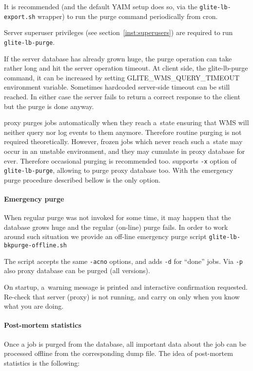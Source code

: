 It is recommended (and the default YAIM setup does so, via
the \verb'glite-lb-export.sh' wrapper) to run the purge
command periodically from cron.

Server superuser privileges (see section~\ref{inst:superusers}) are required to run \verb'glite-lb-purge'.

If the server database has already grown huge, the purge operation can take
rather long and hit the \LB server operation timeout. At client side, \ie the
glite-lb-purge command, it can be increased by setting GLITE\_WMS\_QUERY\_TIMEOUT
environment variable.
Sometimes hardcoded server-side timeout can be still reached. In either case the
server fails to return a correct response to the client but the purge is done anyway. 

\LB proxy purges jobs automatically when they reach a~state ensuring that WMS will
neither query nor log events to them anymore.
Therefore routine purging is not required theoretically.
However, frozen jobs which never reach such a~state may occur in an unstable environment,
and they may cumulate in \LB proxy database for ever.
Therefore occasional purging is recommended too.
\LBnew supports \verb'-x' option of \verb'glite-lb-purge', allowing
to purge \LB proxy database too.
With \LBold the emergency purge procedure described bellow is the only option.

\paragraph{Emergency purge}

When regular purge was not invoked for some time, it may happen that 
the database grows huge and the regular (on-line) purge fails.
In order to work around such situation we provide an off-line emergency
purge script \verb'glite-lb-bkpurge-offline.sh'

The script accepts the same \verb'-acno' options, and adds \verb'-d' for ``done'' jobs. 
Via \verb'-p' also \LB proxy database can be purged (all \LB versions).

On startup, a~warning message is printed and interactive confirmation
requested.
Re-check that \LB server (proxy) is not running, and carry on only when you
know what you are doing.

\paragraph{Post-mortem statistics}

Once a job is purged from the database, all important data about the job can be
processed offline from the corresponding dump file. The idea of post-mortem
statistics is the following:

